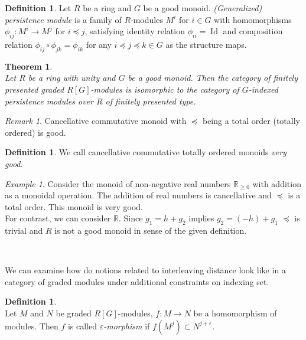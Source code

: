 \documentclass[english,12pt]{article}
\newcounter{stmcounter}[section]
\newcounter{thcounter}
\numberwithin{equation}{section}
\newtheorem{theorem}[thcounter]{Theorem}
\theoremstyle{definition}
\newtheorem{definition}[stmcounter]{Definition}
\theoremstyle{remark}
\newtheorem{remark}[stmcounter]{Remark}
\newtheorem{example}[stmcounter]{Example}
\newcommand{\define}[1]{{\textit{#1}}}
\renewcommand{\geq}{\geqslant}
\begin{document}
\begin{definition} {\cite[Definition 12]{Corbet18}}
  Let $R$ be a ring and $G$ be a good monoid. \define{(Generalized) persistence module} is a family of $R$-modules $M^i$ for $i \in G$ with homomorphisms $\phi_{ij} : M^i \to M^j$ for $i \preceq j$, satisfying identity relation $\phi_{ii} = \operatorname{Id}$ and composition relation $\phi_{ij} \circ \phi_{jk} = \phi_{ik}$ for any $i \preceq j \preceq k \in G$ as the structure maps.
\end{definition}

\begin{theorem} {\cite[Theorem 21]{Corbet18}}\\
  Let $R$ be a ring with unity and $G$ be a good monoid. Then the category of finitely presented graded $R[G]$-modules is isomorphic to the category of $G$-indexed persistence modules over $R$ of finitely presented type.
\end{theorem}

\begin{remark}
  Cancellative commutative monoid with $\preceq$ being a total order (totally ordered) is good.
\end{remark}

\begin{definition}
  We call cancellative commutative totally ordered monoids \define{very good}.
\end{definition}

\begin{example}
  Consider the monoid of non-negative real numbers $\mathbb{R}_{\geq 0}$ with addition as a monoidal operation. The addition of real numbers is cancellative and $\preceq$ is a total order. This monoid is very good.\\

  For contrast, we can consider $\mathbb{R}$. Since $g_1 = h + g_2$ implies $g_2 = (-h) + g_1$ $\preceq$ is trivial and $R$ is not a good monoid in sense of the given definition.
\end{example} ~ \par

We can examine how do notions related to interleaving distance look like in a category of graded modules under additional constraints on indexing set.

\begin{definition} {\cite[Definition 2.7]{GS16}}\\
  Let $M$ and $N$ be graded $R[G]$-modules, $f : M \to N$ be a homomorphism of modules. Then $f$ is called \define{$\varepsilon$-morphism} if $f(M^j) \subset N^{j+\varepsilon}$.
\end{definition}
\end{document}
